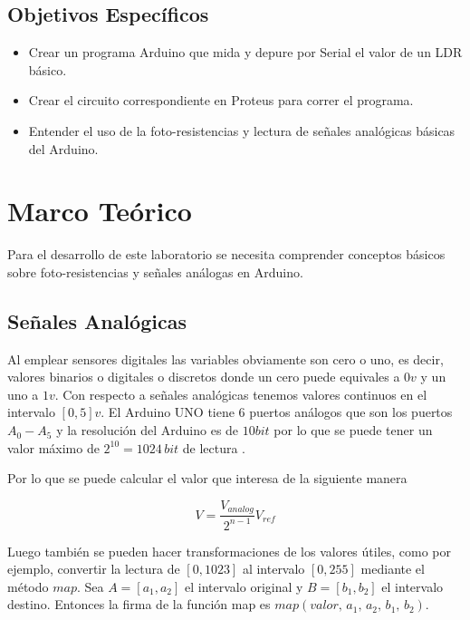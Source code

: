 \documentclass{article}
\begin{document}
    \subsection{Objetivos Específicos}

    \begin{itemize}
        \item Crear un programa Arduino que mida y depure por Serial el valor
        de un LDR básico.
        \item Crear el circuito correspondiente en Proteus para correr el
        programa.
        \item Entender el uso de la foto-resistencias y lectura de señales
        analógicas básicas del Arduino.
    \end{itemize}

    \section{Marco Teórico}

    Para el desarrollo de este laboratorio se necesita comprender conceptos
    básicos sobre foto-resistencias y señales análogas en Arduino.

    \subsection{Señales Analógicas}

    Al emplear sensores digitales las variables obviamente son cero o uno, es
    decir, valores binarios o digitales o discretos donde un cero puede
    equivales a $0v$ y un uno a $1v$. Con respecto a señales analógicas
    tenemos valores continuos en el intervalo $[0, 5]v$. El Arduino UNO tiene
    6 puertos análogos que son los puertos $A_0 - A_5$ y la resolución del
    Arduino es de $10 bit$ por lo que se puede tener un valor máximo de
    $2^{10} = 1024 \, bit$ de lectura \cite{flores-2018}.

    \bigbreak

    Por lo que se puede calcular el valor que interesa de la siguiente manera

    $$
    V = \frac{V_{analog}}{2^{n-1}} V_{ref}
    $$

    Luego también se pueden hacer transformaciones de los valores útiles,
    como por ejemplo, convertir la lectura de $[0, 1023]$ al intervalo $[0,
    255]$ mediante el método $map$. Sea $A = [a_1, a_2]$ el intervalo
    original y $B = [b_1, b_2]$ el intervalo destino. Entonces la firma de la
    función map es $map(valor, \, a_1, \, a_2, \, b_1, \, b_2)$.
\end{document}
